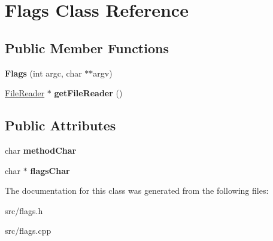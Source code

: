 \hypertarget{class_flags}{\section{Flags Class Reference}
\label{class_flags}
}
\subsection*{Public Member Functions}
\begin{DoxyCompactItemize}
\item 
\hypertarget{class_flags_aa0237bec0b2d60401802f05b0f3a0a8d}{{\bfseries Flags} (int argc, char $\ast$$\ast$argv)}\label{class_flags_aa0237bec0b2d60401802f05b0f3a0a8d}

\item 
\hypertarget{class_flags_ac6dfb2c60086a755ce86c0bb16039f3b}{\hyperlink{class_file_reader}{File\-Reader} $\ast$ {\bfseries get\-File\-Reader} ()}\label{class_flags_ac6dfb2c60086a755ce86c0bb16039f3b}

\end{DoxyCompactItemize}
\subsection*{Public Attributes}
\begin{DoxyCompactItemize}
\item 
\hypertarget{class_flags_af46e5e0ef36162e5886ac80bb0e252c4}{char {\bfseries method\-Char}}\label{class_flags_af46e5e0ef36162e5886ac80bb0e252c4}

\item 
\hypertarget{class_flags_ac76634aa16ccc75ea6488eac5559adcd}{char $\ast$ {\bfseries flags\-Char}}\label{class_flags_ac76634aa16ccc75ea6488eac5559adcd}

\end{DoxyCompactItemize}


The documentation for this class was generated from the following files\-:\begin{DoxyCompactItemize}
\item 
src/flags.\-h\item 
src/flags.\-cpp\end{DoxyCompactItemize}
